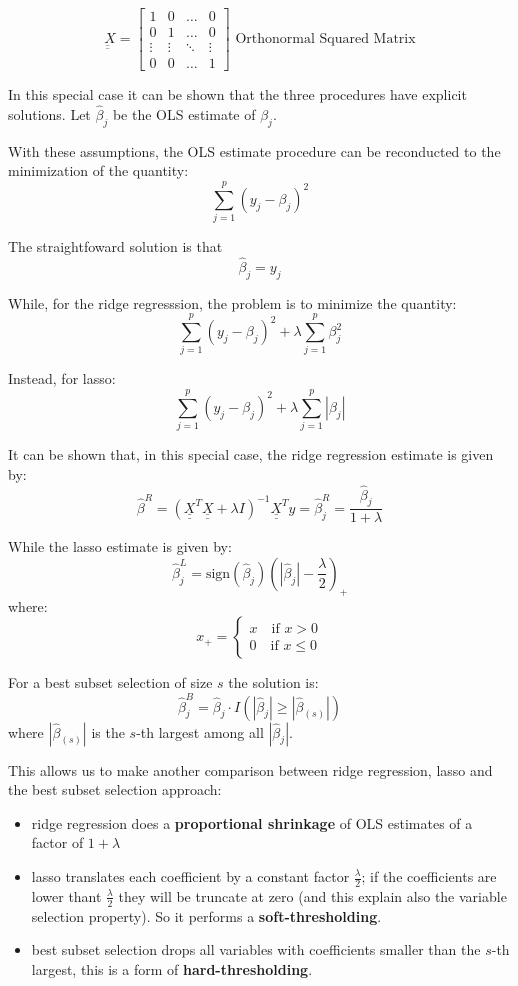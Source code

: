 \[
    \underbar{\underbar X} = \begin{bmatrix}
        1 & 0 & \dots & 0 \\
        0 & 1 & \dots & 0 \\
        \vdots & \vdots & \ddots & \vdots \\
        0 & 0 & \dots & 1
        \end{bmatrix}\text{ Orthonormal Squared Matrix}
\]

In this special case it can be shown that the three procedures have explicit solutions. Let $\hat{\beta}_j$ be the OLS estimate of $\beta_j$.

With these assumptions, the OLS estimate procedure can be reconducted to the minimization of the quantity:
\[
    \sum_{j=1}^p \left(y_j - \beta_j\right)^2 
\]

The straightfoward solution is that
\[
    \hat{\beta}_j = y_j
\]

While, for the ridge regresssion, the problem is to minimize the quantity:
\[
    \sum_{j=1}^p \left(y_j - \beta_j\right)^2 + \lambda \sum_{j=1}^p \beta_j^2
\]

Instead, for lasso:
\[
    \sum_{j=1}^p \left(y_j - \beta_j\right)^2 + \lambda \sum_{j=1}^p |\beta_j|
\]

It can be shown that, in this special case, the ridge regression estimate is given by:
\[
    \hat{\beta}^{R} = \left(\underline{\underline X}^T \underline{\underline X} + \lambda I\right)^{-1} \underline{\underline X}^T y = \hat{\beta}_j^R = \frac{\hat{\beta}_j}{1 + \lambda}
\]

While the lasso estimate is given by:
\[
    \hat{\beta}_j^L = \text{sign}(\hat{\beta}_j)\left(|\hat{\beta}_j| - \frac{\lambda }{2}\right)_+
\]
where:
\[
    x_+ = \begin{cases}
        x\quad\text{if $x > 0$}\\
        0\quad\text{if $x\le 0$}
        \end{cases}
\]

For a best subset selection of size $s$ the solution is:
\[
    \hat{\beta}_j^B = \hat{\beta}_j \cdot I(|\hat{\beta}_j| \geq |\hat{\beta}_{(s)}|)
\]
where $|\hat{\beta}_{(s)}|$ is the $s$-th largest among all $|\hat{\beta}_j|$.






This allows us to make another comparison between ridge regression, lasso and the best subset selection approach:
\begin{itemize}
    \item ridge regression does a \textbf{proportional shrinkage} of OLS estimates of a factor of $1+\lambda$
    \item lasso translates each coefficient by a constant factor $\frac{\lambda}{2}$; if the coefficients are lower thant $\frac{\lambda}2$ they will be truncate at zero (and this explain also the variable selection property). So it performs a \textbf{soft-thresholding}.
    \item best subset selection drops all variables with coefficients smaller than the $s$-th largest, this is a form of \textbf{hard-thresholding}.
\end{itemize}

